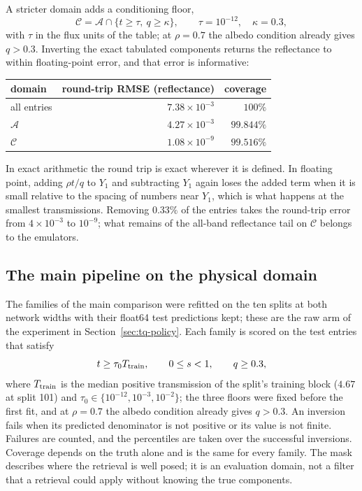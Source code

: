 A stricter domain adds a conditioning floor,
\[
 \mathcal C=\mathcal A\cap\{t\ge\tau,\ q\ge\kappa\},
 \qquad \tau=10^{-12},\quad\kappa=0.3,
\]
with $\tau$ in the flux units of the table; at $\rho=0.7$ the albedo condition already gives
$q>0.3$. Inverting the exact tabulated components returns the reflectance to within
floating-point error, and that error is informative:

\begin{center}
\begin{tabular}{lrr}
\toprule
domain & round-trip RMSE (reflectance) & coverage \\
\midrule
all entries & $7.38\times10^{-3}$ & $100\%$ \\
$\mathcal A$ & $4.27\times10^{-3}$ & $99.844\%$ \\
$\mathcal C$ & $1.08\times10^{-9}$ & $99.516\%$ \\
\bottomrule
\end{tabular}
\end{center}

In exact arithmetic the round trip is exact wherever it is defined. In floating point, adding
$\rho t/q$ to $Y_1$ and subtracting $Y_1$ again loses the added term when it is small relative to
the spacing of numbers near $Y_1$, which is what happens at the smallest transmissions. Removing
$0.33\%$ of the entries takes the round-trip error from $4\times10^{-3}$ to $10^{-9}$; what remains
of the all-band reflectance tail on $\mathcal C$ belongs to the emulators.

\subsection{The main pipeline on the physical domain}\label{sec:tq-domain}
The families of the main comparison were refitted on the ten splits at both network widths with
their float64 test predictions kept; these are the raw arm of the experiment in
Section~\ref{sec:tq-policy}. Each family is scored on the test entries that satisfy
\[
 t\ge\tau_0T_{\rm train},\qquad 0\le s<1,\qquad q\ge0.3,
\]
where $T_{\rm train}$ is the median positive transmission of the split's training block ($4.67$ at
split 101) and $\tau_0\in\{10^{-12},10^{-3},10^{-2}\}$; the three floors were fixed before the
first fit, and at $\rho=0.7$ the albedo condition already gives $q>0.3$. An inversion fails when
its predicted denominator is not positive or its value is not finite. Failures are counted, and
the percentiles are taken over the successful inversions. Coverage depends on the truth alone and
is the same for every family. The mask describes where the retrieval is well posed; it is an
evaluation domain, not a filter that a retrieval could apply without knowing the true components.

